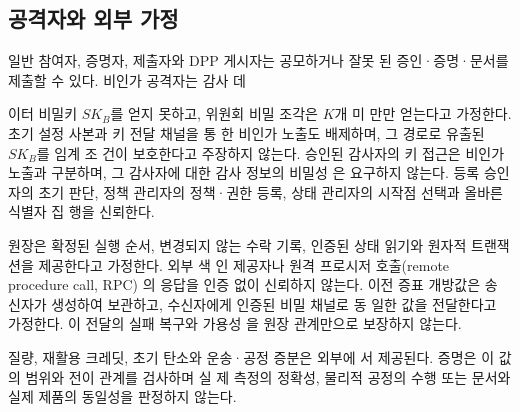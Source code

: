 \subsection{공격자와 외부 가정}
일반 참여자, 증명자, 제출자와 DPP 게시자는 공모하거나 잘못
된 증인·증명·문서를 제출할 수 있다. 비인가 공격자는 감사 데

이터 비밀키 \(SK_{B}\)를 얻지 못하고, 위원회 비밀 조각은 \(K\)개 미
만만 얻는다고 가정한다. 초기 설정 사본과 키 전달 채널을 통
한 비인가 노출도 배제하며, 그 경로로 유출된 \(SK_{B}\)를 임계 조
건이 보호한다고 주장하지 않는다. 승인된 감사자의 키 접근은
비인가 노출과 구분하며, 그 감사자에 대한 감사 정보의 비밀성
은 요구하지 않는다. 등록 승인자의 초기 판단, 정책 관리자의
정책·권한 등록, 상태 관리자의 시작점 선택과 올바른 식별자 집
행을 신뢰한다.

원장은 확정된 실행 순서, 변경되지 않는 수락 기록, 인증된
상태 읽기와 원자적 트랜잭션을 제공한다고 가정한다. 외부 색
인 제공자나 원격 프로시저 호출(remote procedure call, RPC)
의 응답을 인증 없이 신뢰하지 않는다. 이전 증표 개방값은 송
신자가 생성하여 보관하고, 수신자에게 인증된 비밀 채널로 동
일한 값을 전달한다고 가정한다. 이 전달의 실패 복구와 가용성
을 원장 관계만으로 보장하지 않는다.

질량, 재활용 크레딧, 초기 탄소와 운송·공정 증분은 외부에
서 제공된다. 증명은 이 값의 범위와 전이 관계를 검사하며 실
제 측정의 정확성, 물리적 공정의 수행 또는 문서와 실제 제품의
동일성을 판정하지 않는다.
